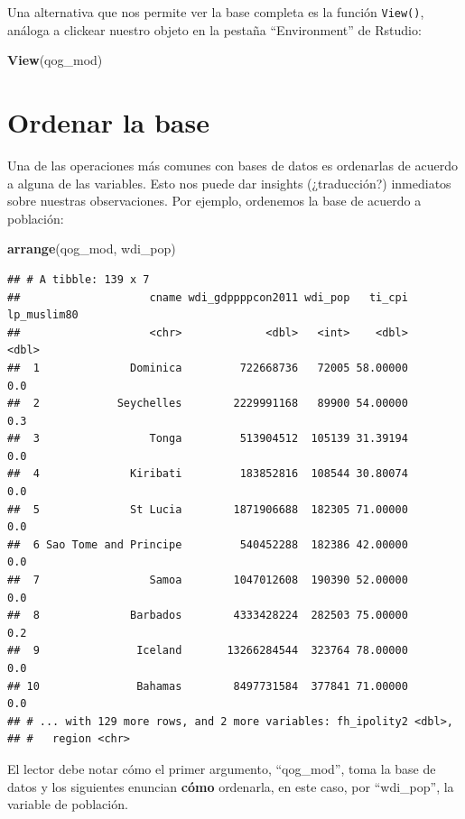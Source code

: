 \documentclass[]{book}
\newenvironment{Shaded}{\begin{snugshade}}{\end{snugshade}}
\newcommand{\KeywordTok}[1]{\textcolor[rgb]{0.13,0.29,0.53}{\textbf{#1}}}
\newcommand{\NormalTok}[1]{#1}
\begin{document}
Una alternativa que nos permite ver la base completa es la función
\texttt{View()}, análoga a clickear nuestro objeto en la pestaña
``Environment'' de Rstudio:

\begin{Shaded}
\begin{Highlighting}[]
\KeywordTok{View}\NormalTok{(qog_mod)}
\end{Highlighting}
\end{Shaded}

\section{Ordenar la base}\label{ordenar-la-base}

Una de las operaciones más comunes con bases de datos es ordenarlas de
acuerdo a alguna de las variables. Esto nos puede dar insights
(¿traducción?) inmediatos sobre nuestras observaciones. Por ejemplo,
ordenemos la base de acuerdo a población:

\begin{Shaded}
\begin{Highlighting}[]
\KeywordTok{arrange}\NormalTok{(qog_mod, wdi_pop)}
\end{Highlighting}
\end{Shaded}

\begin{verbatim}
## # A tibble: 139 x 7
##                    cname wdi_gdppppcon2011 wdi_pop   ti_cpi lp_muslim80
##                    <chr>             <dbl>   <int>    <dbl>       <dbl>
##  1              Dominica         722668736   72005 58.00000         0.0
##  2            Seychelles        2229991168   89900 54.00000         0.3
##  3                 Tonga         513904512  105139 31.39194         0.0
##  4              Kiribati         183852816  108544 30.80074         0.0
##  5              St Lucia        1871906688  182305 71.00000         0.0
##  6 Sao Tome and Principe         540452288  182386 42.00000         0.0
##  7                 Samoa        1047012608  190390 52.00000         0.0
##  8              Barbados        4333428224  282503 75.00000         0.2
##  9               Iceland       13266284544  323764 78.00000         0.0
## 10               Bahamas        8497731584  377841 71.00000         0.0
## # ... with 129 more rows, and 2 more variables: fh_ipolity2 <dbl>,
## #   region <chr>
\end{verbatim}

El lector debe notar cómo el primer argumento, ``qog\_mod'', toma la
base de datos y los siguientes enuncian \textbf{cómo} ordenarla, en este
caso, por ``wdi\_pop'', la variable de población.
\end{document}
